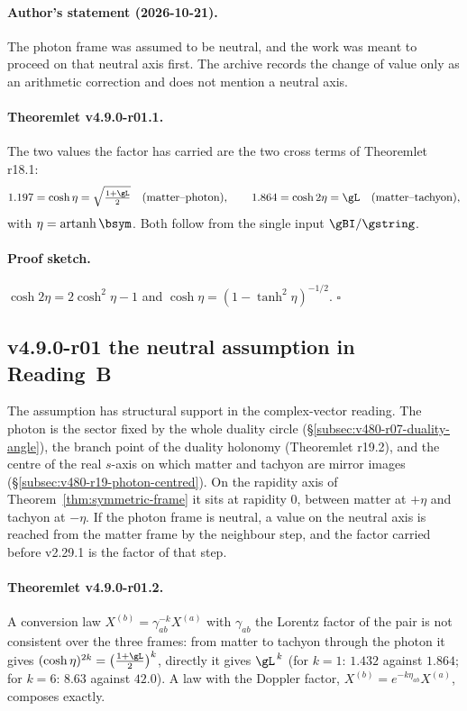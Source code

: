 \paragraph{Author's statement (2026-10-21).}
The photon frame was assumed to be neutral, and the work was meant to proceed on that neutral axis first.  The archive
records the change of value only as an arithmetic correction and does not mention a neutral axis.

\paragraph{Theoremlet v4.9.0-r01.1.}
The two values the factor has carried are the two cross terms of Theoremlet r18.1:
\[
1.197=\cosh\eta=\sqrt{\tfrac{1+\gL}{2}}\quad\text{(matter--photon)},\qquad
1.864=\cosh2\eta=\gL\quad\text{(matter--tachyon)},
\]
with \(\eta=\operatorname{artanh}\bsym\).  Both follow from the single input \(\gBI/\gstring\).

\paragraph{Proof sketch.}
\(\cosh2\eta=2\cosh^2\eta-1\) and \(\cosh\eta=(1-\tanh^2\eta)^{-1/2}\).  \(\square\)

\subsection*{v4.9.0-r01 the neutral assumption in Reading~B}
\label{subsec:v490-r01-neutral}

The assumption has structural support in the complex-vector reading.  The photon is the sector fixed by the whole duality
circle (\S\ref{subsec:v480-r07-duality-angle}), the branch point of the duality holonomy (Theoremlet r19.2), and the
centre of the real \(s\)-axis on which matter and tachyon are mirror images (\S\ref{subsec:v480-r19-photon-centred}).
On the rapidity axis of Theorem~\ref{thm:symmetric-frame} it sits at rapidity \(0\), between matter at \(+\eta\) and
tachyon at \(-\eta\).  If the photon frame is neutral, a value on the neutral axis is reached from the matter frame by the
neighbour step, and the factor carried before v2.29.1 is the factor of that step.

\paragraph{Theoremlet v4.9.0-r01.2.}
A conversion law \(X^{(b)}=\gamma_{ab}^{-k}X^{(a)}\) with \(\gamma_{ab}\) the Lorentz factor of the pair is not
consistent over the three frames: from matter to tachyon through the photon it gives
\((\cosh\eta)^{2k}=\bigl(\tfrac{1+\gL}{2}\bigr)^k\), directly it gives \(\gL^{\,k}\) (for \(k=1\): \(1.432\) against
\(1.864\); for \(k=6\): \(8.63\) against \(42.0\)).  A law with the Doppler factor, \(X^{(b)}=e^{-k\eta_{ab}}X^{(a)}\),
composes exactly.


